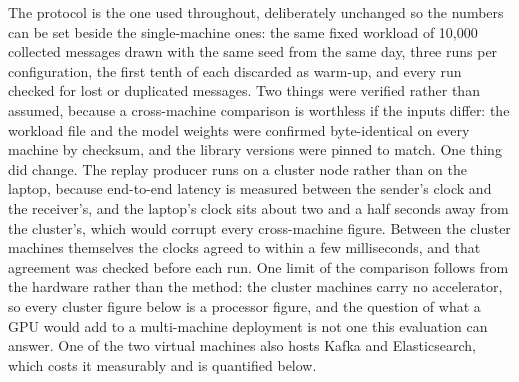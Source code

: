 The protocol is the one used throughout, deliberately unchanged so the numbers can be set beside the single-machine ones: the same fixed workload of 10,000 collected messages drawn with the same seed from the same day, three runs per configuration, the first tenth of each discarded as warm-up, and every run checked for lost or duplicated messages. Two things were verified rather than assumed, because a cross-machine comparison is worthless if the inputs differ: the workload file and the model weights were confirmed byte-identical on every machine by checksum, and the library versions were pinned to match. One thing did change. The replay producer runs on a cluster node rather than on the laptop, because end-to-end latency is measured between the sender's clock and the receiver's, and the laptop's clock sits about two and a half seconds away from the cluster's, which would corrupt every cross-machine figure. Between the cluster machines themselves the clocks agreed to within a few milliseconds, and that agreement was checked before each run. One limit of the comparison follows from the hardware rather than the method: the cluster machines carry no accelerator, so every cluster figure below is a processor figure, and the question of what a GPU would add to a multi-machine deployment is not one this evaluation can answer. One of the two virtual machines also hosts Kafka and Elasticsearch, which costs it measurably and is quantified below.

